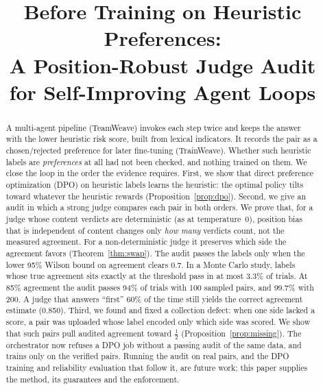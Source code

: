 \documentclass[conference]{IEEEtran}
\theoremstyle{remark}
\begin{document}
\title{Before Training on Heuristic Preferences:\\ A Position-Robust Judge Audit\\ for Self-Improving Agent Loops}

\author{
}

\maketitle

\begin{abstract}
A multi-agent pipeline (TeamWeave) invokes each step twice and keeps the answer with the lower heuristic risk score, built from lexical indicators. It records the pair as a chosen/rejected preference for later fine-tuning (TrainWeave). Whether such heuristic labels are \emph{preferences} at all had not been checked, and nothing trained on them. We close the loop in the order the evidence requires. First, we show that direct preference optimization (DPO) on heuristic labels learns the heuristic: the optimal policy tilts toward whatever the heuristic rewards (Proposition~\ref{prop:dpo}). Second, we give an audit in which a strong judge compares each pair in both orders. We prove that, for a judge whose content verdicts are deterministic (as at temperature~0), position bias that is independent of content changes only \emph{how many} verdicts count, not the measured agreement. For a non-deterministic judge it preserves which side the agreement favors (Theorem~\ref{thm:swap}). The audit passes the labels only when the lower 95\% Wilson bound on agreement clears 0.7. In a Monte Carlo study, labels whose true agreement sits exactly at the threshold pass in at most 3.3\% of trials. At 85\% agreement the audit passes 94\% of trials with 100 sampled pairs, and 99.7\% with 200. A judge that answers ``first'' 60\% of the time still yields the correct agreement estimate (0.850). Third, we found and fixed a collection defect: when one side lacked a score, a pair was uploaded whose label encoded only which side was scored. We show that such pairs pull audited agreement toward $\tfrac12$ (Proposition~\ref{prop:missing}). The orchestrator now refuses a DPO job without a passing audit of the same data, and trains only on the verified pairs. Running the audit on real pairs, and the DPO training and reliability evaluation that follow it, are future work; this paper supplies the method, its guarantees and the enforcement.
\end{abstract}
\end{document}
